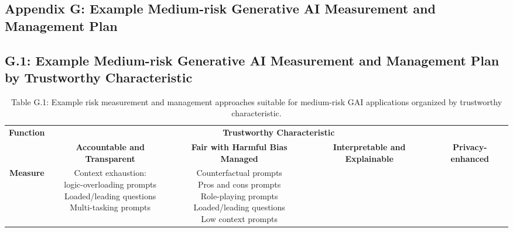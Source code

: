 \documentclass[fleqn]{article}
\begin{document}
\begin{landscape}
\section*{Appendix G: Example Medium-risk Generative AI Measurement and Management Plan}\label{sec:appndxg}

\subsection*{G.1: Example Medium-risk Generative AI Measurement and Management Plan by Trustworthy Characteristic}\label{appdxg1}

\begin{table}[H]
	\caption*{Table G.1: Example risk measurement and management approaches suitable for medium-risk GAI applications organized by trustworthy characteristic.}
	\footnotesize
	\begin{tabular}{|c|c|c|c|c|}
		\hline
		\multirow{2}{*}{\textbf{Function}} & \multicolumn{4}{|c|}{\textbf{Trustworthy Characteristic}}   \\
		\cline{2-5}
		& \textbf{Accountable and Transparent} & \textbf{Fair with Harmful Bias Managed} & \textbf{Interpretable and Explainable} & \textbf{Privacy-enhanced} \\
		\hline
		\textbf{Measure} & 
		\makecell[l]{
			\textbullet\hspace{3pt} Context exhaustion:\\\hspace{10pt}logic-overloading prompts \\
			\textbullet\hspace{3pt} Loaded/leading questions \\
			\textbullet\hspace{3pt} Multi-tasking prompts \\
		}
		&
		\makecell[l]{ 	
			\textbullet\hspace{3pt} Counterfactual prompts\\  	
			\textbullet\hspace{3pt} Pros and cons prompts\\  	
			\textbullet\hspace{3pt} Role-playing prompts\\  	
			\textbullet\hspace{3pt} Loaded/leading questions\\  	
			\textbullet\hspace{3pt} Low context prompts\\  	
}
\end{tabular}
\end{table}
\end{landscape}
\end{document}
